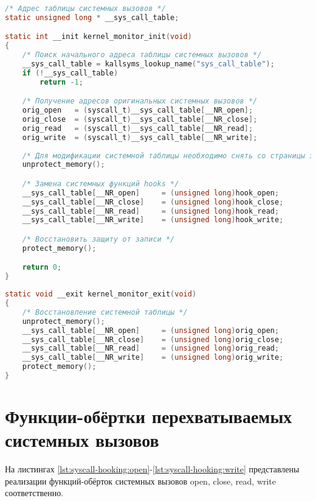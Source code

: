     \begin{lstlisting}[language=C, label=lst:syscall-hooking:init, caption=Модификация таблицы системных вызовов]
/* Адрес таблицы системных вызовов */
static unsigned long * __sys_call_table;

static int __init kernel_monitor_init(void)
{
    /* Поиск начального адреса таблицы системных вызовов */
    __sys_call_table = kallsyms_lookup_name("sys_call_table");
    if (!__sys_call_table)
        return -1;

    /* Получение адресов оригинальных системных вызовов */
    orig_open   = (syscall_t)__sys_call_table[__NR_open];
    orig_close  = (syscall_t)__sys_call_table[__NR_close];
    orig_read   = (syscall_t)__sys_call_table[__NR_read];
    orig_write  = (syscall_t)__sys_call_table[__NR_write];
    
    /* Для модификации системной таблицы необходимо снять со страницы защиту от записи */
    unprotect_memory();

    /* Замена системных функций hooks */
    __sys_call_table[__NR_open]     = (unsigned long)hook_open;
    __sys_call_table[__NR_close]    = (unsigned long)hook_close;
    __sys_call_table[__NR_read]     = (unsigned long)hook_read;
    __sys_call_table[__NR_write]    = (unsigned long)hook_write;

    /* Восстановить защиту от записи */
    protect_memory();

    return 0;
}
    \end{lstlisting}

    \begin{lstlisting}[language=C, label=lst:syscall-hooking:exit, caption=Восстановление таблицы системных вызовов]
static void __exit kernel_monitor_exit(void)
{
    /* Восстановление системной таблицы */
    unprotect_memory();
    __sys_call_table[__NR_open]     = (unsigned long)orig_open;
    __sys_call_table[__NR_close]    = (unsigned long)orig_close;
    __sys_call_table[__NR_read]     = (unsigned long)orig_read;
    __sys_call_table[__NR_write]    = (unsigned long)orig_write;
    protect_memory();
}
    \end{lstlisting}

\section{Функции-обёртки перехватываемых системных вызовов}
    На листингах \ref{lst:syscall-hooking:open}-\ref{lst:syscall-hooking:write} 
    представлены реализации функций-обёрток системных вызовов open, close, read, write соответственно.


